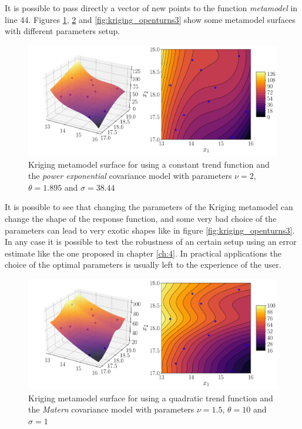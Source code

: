 \newpage

It is possible to pass directly a vector of new points to the function \textit{metamodel} in line 44. Figures \ref{fig:kriging_openturns}, \ref{fig:kriging_openturns2} and \ref{fig:kriging_openturns3} show some metamodel surfaces with different parameters setup.

\begin{figure}[h]
\centering
\includegraphics[width=0.9\linewidth]{appendix_a/kriging_openturns}
\caption{Kriging metamodel surface for using a constant trend function and the \textit{power exponential} covariance model with parameters $\nu=2$, $\theta=1.895$ and $\sigma=38.44$}
\label{fig:kriging_openturns}
\end{figure}

It is possible to see that changing the parameters of the Kriging metamodel can change the shape of the response function, and some very bad choice of the parameters can lead to very exotic shapes like in figure \ref{fig:kriging_openturns3}. In any case it is possible to test the robustness of an certain setup using an error estimate like the one proposed in chapter \ref{ch:4}. In practical applications the choice of the optimal parameters is usually left to the experience of the user.

\begin{figure}[h]
	\centering
	\includegraphics[width=0.9\linewidth]{appendix_a/kriging_openturns2}
	\caption{Kriging metamodel surface for using a quadratic trend function and the \textit{Matern} covariance model with parameters $\nu=1.5$, $\theta=10$ and $\sigma=1$}
	\label{fig:kriging_openturns2}
\end{figure}

